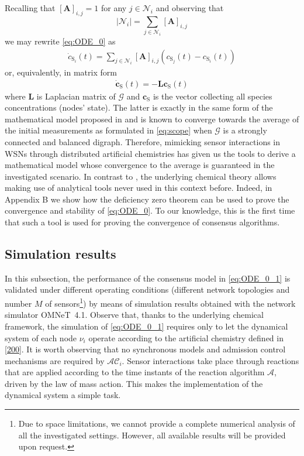 \documentclass[journal]{IEEEtran}
\newcommand{\mol}[1]{\ensuremath{\textrm{#1}}}
\begin{document}
Recalling that $[\mathbf {A}]_{i,j} = 1$ for any $j \in {\mathcal{N}_i}$ and observing that 
\begin{equation}
{|\mathcal{N}_i|} = \sum\limits_{j \in {\mathcal{N}_i}} [\mathbf {A}]_{i,j}
\end{equation}
we may rewrite \eqref{eq:ODE_0} as
\begin{align}\label{eq:ODE_0_1_a}
{\dot c_{{\mol{S}_i}}} (t) =  \sum\limits_{j \in {\mathcal{N}_i}} {[\mathbf {A}]_{i,j}\left({ c_{\mol{S}_j}(t) - }{c_{\mol{S}_i}}(t)\right)}
\end{align}
or, equivalently, in matrix form
\begin{align}\label{eq:ODE_0_1}
{\dot {\mathbf{c}}_{{\mol{S}}}} (t) =  -\mathbf{L}{\mathbf{c}_{{\mol{S}}}} (t)
\end{align}
where $\mathbf{L}$ is {Laplacian matrix} of $\mathcal{G}$ and $\mathbf{c}_{{\mol{S}}}$ is the vector collecting all species concentrations (nodes' state).
The latter is exactly in the same form of the mathematical model proposed in \cite{OlMu04} and is known to converge towards the average of the initial measurements as formulated in \eqref{eq:scope} when $\mathcal G$ is a strongly connected and {balanced digraph}. {Therefore, mimicking sensor interactions in WSNs through distributed artificial chemistries has given us the tools to derive a mathematical model whose convergence to the average is guaranteed in the investigated scenario. {In contrast to} \cite{OlMu04}, the underlying chemical theory allows making use of analytical tools never used in this context before. Indeed, in Appendix B we show how the deficiency zero theorem can be used to prove the convergence and stability of \eqref{eq:ODE_0}. To our knowledge, this is the first time that such a tool is used for proving the convergence of consensus algorithms.}

\subsection{Simulation results}

{{In this subsection}, the performance of the consensus model in \eqref{eq:ODE_0_1} is validated under different operating conditions (different network topologies and number $M$ of sensors\footnote{Due to space limitations, we cannot provide a complete numerical analysis of all the investigated settings. However, all available results will be provided upon request.}) by means of simulation results obtained with the network simulator OMNeT~4.1.} 
{Observe that, thanks to the underlying chemical framework, the simulation of \eqref{eq:ODE_0_1} requires only to let the dynamical system of each node $\nu_i$ operate according to the artificial chemistry {defined in \eqref{200}}. It is worth observing that no synchronous models and admission control mechanisms are required by $\mathcal{AC}_i$. Sensor interactions take place through reactions that are applied according to the time instants of the reaction algorithm $\mathcal A$, driven by the law of mass action. This makes the implementation of the dynamical system a simple task.}
\end{document}
